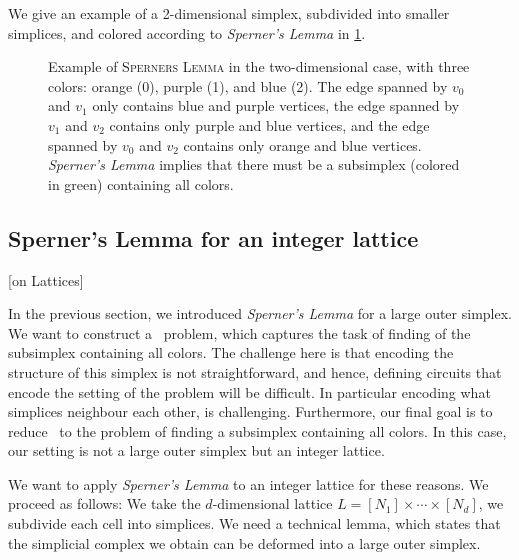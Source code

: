 We give an example of a 2-dimensional simplex, subdivided into smaller simplices, and colored according to \textit{Sperner's Lemma} in \cref{fig:sperner_lemma_example}.

\begin{figure}[ht]
	\centering
	\caption[Example of \textsc{Sperners Lemma}]{Example of \textsc{Sperners Lemma} in the two-dimensional case, with three colors: orange (0), purple (1), and blue (2). The edge spanned by $v_0$ and $v_1$ only contains blue and purple vertices, the edge spanned by $v_1$ and $v_2$ contains only purple and blue vertices, and the edge spanned by $v_0$ and $v_2$ contains only orange and blue vertices. \textit{Sperner's Lemma} implies that there must be a subsimplex (colored in green) containing all colors.}\label{fig:sperner_lemma_example}
\end{figure}

\subsection{Sperner's Lemma for an integer lattice}[on Lattices]

In the previous section, we introduced \textit{Sperner's Lemma} for a large outer simplex. We want to construct a \TFNP\ problem, which captures the task of finding of the subsimplex containing all colors. The challenge here is that encoding the structure of this simplex is not straightforward, and hence, defining circuits that encode the setting of the problem will be difficult. In particular encoding what simplices neighbour each other, is challenging. Furthermore, our final goal is to reduce \Tarskistar\ to the problem of finding a subsimplex containing all colors. In this case, our setting is not a large outer simplex but an integer lattice.

We want to apply \textit{Sperner's Lemma} to an integer lattice for these reasons. We proceed as follows: We take the $d$-dimensional lattice $L = [N_1] \times \cdots \times [N_d]$, we subdivide each cell into simplices. We need a technical lemma, which states that the simplicial complex we obtain can be deformed into a large outer simplex.

